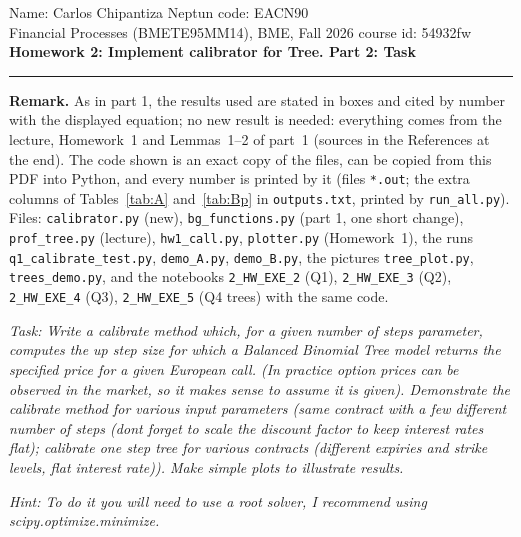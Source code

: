 \documentclass[11pt,a4paper]{article}
\newcommand{\subhead}[1]{\par\medskip\noindent{\large\bfseries #1}\par\smallskip\noindent\ignorespaces}
\begin{document}
\noindent Name: Carlos Chipantiza \hfill Neptun code: EACN90\\
\noindent Financial Processes (BMETE95MM14), BME, Fall 2026 \hfill course id: 54932fw\\[2pt]
{\large\textbf{Homework 2: Implement calibrator for Tree. Part 2: Task}}\\[2pt]
\noindent\rule{\textwidth}{0.4pt}

\noindent\textbf{Remark.} As in part 1, the results used are stated in boxes and cited by number with the displayed equation; no new result is needed: everything comes from the lecture, Homework~1 and Lemmas~1--2 of part~1 (sources in the References at the end). The code shown is an exact copy of the files, can be copied from this PDF into Python, and every number is printed by it (files \texttt{*.out}; the extra columns of Tables~\ref{tab:A} and~\ref{tab:Bp} in \texttt{outputs.txt}, printed by \texttt{run\_all.py}). Files: \texttt{calibrator.py} (new), \texttt{bg\_functions.py} (part 1, one short change), \texttt{prof\_tree.py} (lecture), \texttt{hw1\_call.py}, \texttt{plotter.py} (Homework~1), the runs \texttt{q1\_calibrate\_test.py}, \texttt{demo\_A.py}, \texttt{demo\_B.py}, the pictures \texttt{tree\_plot.py}, \texttt{trees\_demo.py}, and the notebooks \texttt{2\_HW\_EXE\_2} (Q1), \texttt{2\_HW\_EXE\_3} (Q2), \texttt{2\_HW\_EXE\_4} (Q3), \texttt{2\_HW\_EXE\_5} (Q4 trees) with the same code.

\subhead{The assignment.}
\emph{Task: Write a calibrate method which, for a given number of steps parameter, computes the up step size for which a Balanced Binomial Tree model returns the specified price for a given European call. (In practice option prices can be observed in the market, so it makes sense to assume it is given). Demonstrate the calibrate method for various input parameters (same contract with a few different number of steps (dont forget to scale the discount factor to keep interest rates flat); calibrate one step tree for various contracts (different expiries and strike levels, flat interest rate)). Make simple plots to illustrate results.}

\noindent\emph{Hint: To do it you will need to use a root solver, I recommend using scipy.optimize.minimize.}
\end{document}
